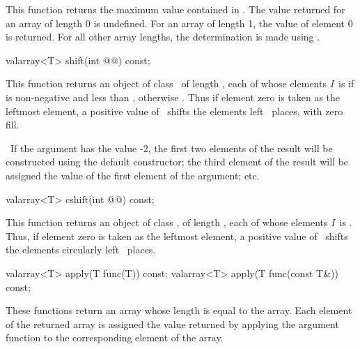 \documentclass[american,twoside]{book}
\begin{document}
\begin{paras}
\begin{itemdescr}
\pnum
This function returns the maximum value contained in
.
The value returned for an array of length 0 is undefined.
For an array
of length 1, the value of element 0 is returned.
For all other array
lengths, the determination is made using
.
\end{itemdescr}

%
\begin{itemdecl}
valarray<T> shift(int @@) const;
\end{itemdecl}

\begin{itemdescr}
\pnum
This function returns an object of class
\
of length
,
each of whose elements
\textit{I}\ 
is
if
is non-negative and less than
,
otherwise
.
Thus if element zero is taken as the leftmost element,
a positive value of \ shifts the elements left \
places, with zero fill.

\pnum
\enterexample\ 
If the argument has the value -2,
the first two elements of the result will be constructed using the default
constructor; the third element of the result will be assigned the value
of the first element of the argument; etc.
\exitexample\ 
%
\begin{itemdecl}
valarray<T> cshift(int @\farg{n}@) const;
\end{itemdecl}

\pnum
This function returns an object of class
\tcode{valarray<T>},
of length
,
each of whose elements
\textit{I}\ 
is
.
Thus, if element zero is taken as the leftmost element,
a positive value of \ shifts the elements circularly
left \farg{n}\ places.
\end{itemdescr}

%
\begin{itemdecl}
valarray<T> apply(T func(T)) const;
valarray<T> apply(T func(const T&)) const;
\end{itemdecl}

\begin{itemdescr}
\pnum
These functions return an array whose length is equal to the array.
Each element of the returned array is assigned
the value returned by applying the argument function to the
corresponding element of the array.


\end{itemdescr}
\end{paras}
\end{document}

